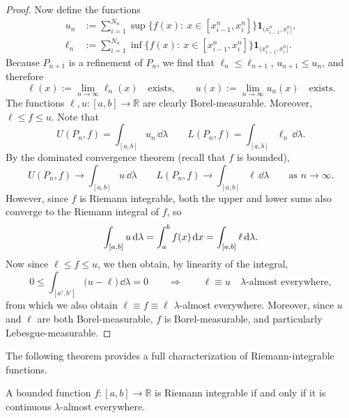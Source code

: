 \begin{proof}
	Now define the functions
	\begin{align*}
	u_n &:= \sum_{i=1}^{N_n} \sup\bigl\{ f(x)  :\ x \in [x^n_{i-1},x^n_i] \bigr\} \mathbf{1}_{(x^n_{i-1},x^n_i]}, \\
	\ell_n &:= \sum_{i=1}^{N_n} \inf\bigl\{ f(x) :\ x \in [x^n_{i-1},x^n_i]\bigr\} \mathbf{1}_{(x^n_{i-1},x^n_i]}.
	\end{align*}
	Because $P_{n+1}$ is a refinement of $P_n$, we find that $\ell_n\le \ell_{n+1}$, $u_{n+1} \leq u_n$, and therefore
	\[
		\ell(x) := \lim_{n \to \infty} \ell_n(x)\quad\text{exists},\qquad u(x) := \lim_{n \to \infty} u_n(x)\quad\text{exists}.
	\]
	The functions $\ell,u:[a,b]\to \mathbb{R}$ are clearly Borel-measurable. Moreover, $\ell \leq f \leq u$. Note that
	\[
	U(P_n, f) = \int_{[a,b]} u_n \,\dd \lambda \qquad L(P_n,f) = \int_{[a,b]} \ell_n \,\dd \lambda.
	\]
	By the dominated convergence theorem (recall that $f$ is bounded),
	\[
	U(P_n, f) \to \int_{[a,b]} u \,\dd \lambda  \qquad L(P_n, f) \to \int_{[a,b]} \ell \,\dd \lambda\qquad\text{as $n\to\infty$}.
	\]
	However, since $f$ is Riemann integrable, both the upper and lower sums also converge to the Riemann integral of $f$, so 
	\[
	\int_{[a,b]} u \,\mathrm{d} \lambda = \int_a^b f(x) \,\mathrm{d} x = \int_{[a,b]} \ell \,\mathrm{d} \lambda.
	\]
	Now since $\ell\le f\le u$, we then obtain, by linearity of the integral,
	\[
		0\le \int_{[a',b']} \bigl(u-\ell\bigr) \,\dd \lambda = 0\qquad\Longrightarrow\qquad \ell\equiv u\quad\text{$\lambda$-almost everywhere},
	\]
from which we also obtain $\ell\equiv f\equiv \ell$ $\lambda$-almost everywhere. Moreover, since $u$ and $\ell$ are both Borel-measurable, $f$ is Borel-measurable, and particularly Lebesgue-measurable.
\end{proof}

The following theorem provides a full characterization of Riemann-integrable functions.

\begin{theorem}
	A bounded function $f:[a,b] \to \mathbb{R}$ is Riemann integrable if and only if it is continuous $\lambda$-almost everywhere.
\end{theorem}




